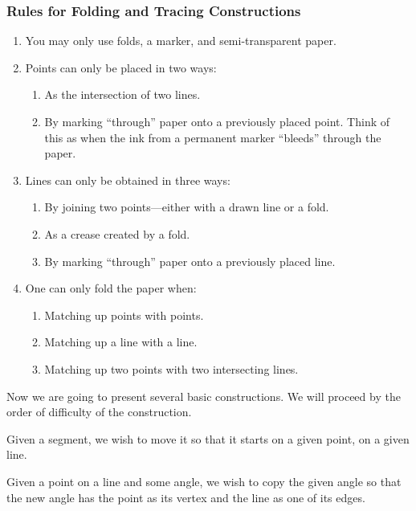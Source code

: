 \subsubsection*{Rules for Folding and Tracing Constructions}
\begin{enumerate}
\item You may only use folds, a marker, and semi-transparent paper.
\item Points can only be placed in two ways:
\begin{enumerate}
\item As the intersection of two lines. 
\item By marking ``through'' paper onto a previously placed
  point. Think of this as when the ink from a permanent marker
  ``bleeds'' through the paper.
\end{enumerate}
\item Lines can only be obtained in three ways:
\begin{enumerate}
\item By joining two points---either with a drawn line or a fold.
\item As a crease created by a fold. 
\item By marking ``through'' paper onto a previously placed
  line.
\end{enumerate}
\item One can only fold the paper when:
\begin{enumerate}
\item Matching up points with points.
\item Matching up a line with a line.
\item Matching up two points with two intersecting lines.
\end{enumerate}
\end{enumerate}


Now we are going to present several basic constructions. We will
proceed by the order of difficulty of the construction.


\begin{con}  
Given a segment, we wish to move it so that it starts on a given
point, on a given line.
\end{con}


\begin{con} 
Given a point on a line and some angle, we wish to copy the given
angle so that the new angle has the point as its vertex and the line
as one of its edges.
\end{con}

